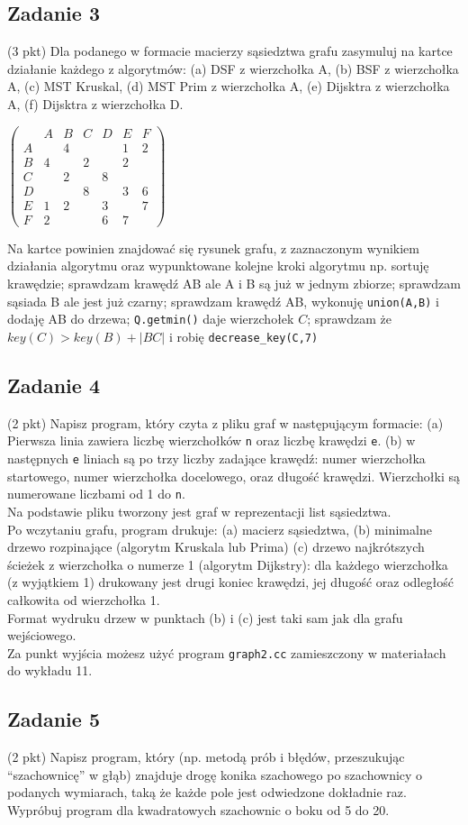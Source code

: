 \documentclass{article}
\begin{document}
\subsection*{Zadanie 3}
(3 pkt) Dla podanego w formacie macierzy sąsiedztwa grafu zasymuluj na kartce działanie
każdego z algorytmów: (a) DSF z wierzchołka A, (b) BSF z wierzchołka A, (c) MST
Kruskal, (d) MST Prim z wierzchołka A, (e) Dijsktra z wierzchołka A, (f) Dijsktra z
wierzchołka D.
\begin{center}$
        \begin{pmatrix}
              & A & B & C & D & E & F \\
            A &   & 4 &   &   & 1 & 2 \\
            B & 4 &   & 2 &   & 2 &   \\
            C &   & 2 &   & 8 &   &   \\
            D &   &   & 8 &   & 3 & 6 \\
            E & 1 & 2 &   & 3 &   & 7 \\
            F & 2 &   &   & 6 & 7 &
        \end{pmatrix}$
\end{center}
Na kartce powinien znajdować się rysunek grafu, z zaznaczonym wynikiem działania algorytmu
oraz wypunktowane kolejne kroki algorytmu np. sortuję krawędzie; sprawdzam
krawędź AB ale A i B są już w jednym zbiorze; sprawdzam sąsiada B ale jest już czarny;
sprawdzam krawędź AB, wykonuję \verb|union(A,B)| i dodaję AB do drzewa; \verb|Q.getmin()|
daje wierzchołek $C$; sprawdzam że $key(C) > key(B) + |BC|$ i robię \verb|decrease_key(C,7)|

\subsection*{Zadanie 4}
(2 pkt) Napisz program, który czyta z pliku graf w następującym formacie:
(a) Pierwsza linia zawiera liczbę wierzchołków \verb|n| oraz liczbę krawędzi \verb|e|.
(b) w następnych \verb|e| liniach są po trzy liczby zadające krawędź: numer wierzchołka
startowego, numer wierzchołka docelowego, oraz długość krawędzi. Wierzchołki są numerowane liczbami od 1 do \verb|n|. \\[1em]
Na podstawie pliku tworzony jest graf w reprezentacji list sąsiedztwa. \\[1em]
Po wczytaniu grafu, program drukuje:
(a) macierz sąsiedztwa,
(b) minimalne drzewo rozpinające (algorytm Kruskala lub Prima)
(c) drzewo najkrótszych ścieżek z wierzchołka o numerze 1 (algorytm Dijkstry): dla
każdego wierzchołka (z wyjątkiem 1) drukowany jest drugi koniec krawędzi, jej długość
oraz odległość całkowita od wierzchołka 1. \\[1em]
Format wydruku drzew w punktach (b) i (c) jest taki sam jak dla grafu wejściowego. \\[1em]
Za punkt wyjścia możesz użyć program \verb|graph2.cc| zamieszczony w materiałach do wykładu 11.

\subsection*{Zadanie 5}
(2 pkt) Napisz program, który (np. metodą prób i błędów, przeszukując “szachownicę” w
głąb) znajduje drogę konika szachowego po szachownicy o podanych wymiarach, taką
że każde pole jest odwiedzone dokładnie raz. Wypróbuj program dla kwadratowych szachownic o boku od 5 do 20.
\end{document}

